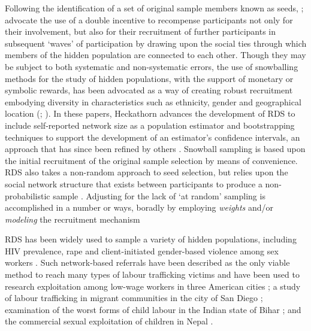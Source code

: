 \documentclass[
  12pt,
  letterpaper,
  DIV=11,
  numbers=noendperiod]{scrartcl}
\theoremstyle{plain}
\theoremstyle{definition}
\begin{document}
Following the identification of a set of original sample members known
as seeds, ; \textcite{heckathorn_respondent-driven_2002} advocate the
use of a double incentive to recompense participants not only for their
involvement, but also for their recruitment of further participants in
subsequent `waves' of participation by drawing upon the social ties
through which members of the hidden population are connected to each
other. Though they may be subject to both systematic and non-systematic
errors, the use of snowballing methods for the study of hidden
populations, with the support of monetary or symbolic rewards, has been
advocated as a way of creating robust recruitment embodying diversity in
characteristics such as ethnicity, gender and geographical location
(\textcite{heckathorn_respondent-driven_1997};
\textcite{heckathorn_respondent-driven_2002}). In these papers,
Heckathorn advances the development of RDS to include self-reported
network size as a population estimator and bootstrapping techniques to
support the development of an estimator's confidence intervals, an
approach that has since been refined by others
\autocite{gile_network_2015}. Snowball sampling is based upon the
initial recruitment of the original sample selection by means of
convenience. RDS also takes a non-random approach to seed selection, but
relies upon the social network structure that exists between
participants to produce a non-probabilistic sample
\autocite{goodman_comment_2011}. Adjusting for the lack of `at random'
sampling is accomplished in a number or ways, boradly by employing
\emph{weights} and/or \emph{modeling} the recruitment mechanism
\autocite{gile15-network}

RDS has been widely used to sample a variety of hidden populations,
including HIV prevalence, rape and client-initiated gender-based
violence among sex workers
\autocite{mccreesh_evaluation_2012,schwitters_prevalence_2012}. Such
network-based referrals have been described as the only viable method to
reach many types of labour trafficking victims
\autocite{zhang_measuring_2012} and have been used to research
exploitation among low-wage workers in three American cities
\autocite{bernhardt_broken_2009}; a study of labour trafficking in
migrant communities in the city of San Diego
\autocite{vincent_estimating_2017}; examination of the worst forms of
child labour in the Indian state of Bihar \autocite{zhang_victims_2019};
and the commercial sexual exploitation of children in Nepal
\autocite{jordan_overcoming_2020}.
\end{document}
